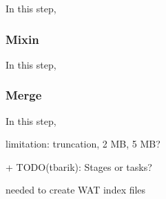 \documentclass[conference]{IEEEtran}
\begin{document}
In this step,
\subsubsection{Mixin} 

In this step,

\subsubsection{Merge} 

In this step,




limitation: truncation, 2 MB, 5 MB?


+ TODO(tbarik): Stages or tasks?

needed to create WAT index files

\end{document}
